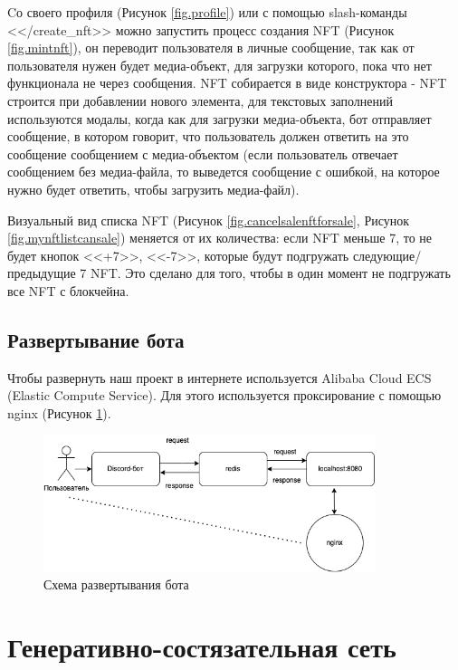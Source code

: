 Cо своего профиля (Рисунок {\color{blue} \ref{fig.profile}}) или с помощью slash-команды <</create\_nft>> можно запустить процесс создания NFT (Рисунок {\color{blue} \ref{fig.mintnft}}), он переводит пользователя в личные сообщение, так как от пользователя нужен будет медиа-объект, для загрузки которого, пока что нет функционала не через сообщения. NFT собирается в виде конструктора - NFT строится при добавлении нового элемента, для текстовых заполнений используются модалы, когда как для загрузки медиа-объекта, бот отправляет сообщение, в котором говорит, что пользователь должен ответить на это сообщение сообщением с медиа-объектом (если пользователь отвечает сообщением без медиа-файла, то выведется сообщение с ошибкой, на которое нужно будет ответить, чтобы загрузить медиа-файл).

\begin{remark}
    Визуальный вид списка NFT (Рисунок {\color{blue} \ref{fig.cancelsalenftforsale}}, Рисунок {\color{blue} \ref{fig.mynftlistcansale}}) меняется от их количества: если NFT меньше 7, то не будет кнопок <<+7>>, <<-7>>, которые будут подгружать следующие/предыдущие 7 NFT. Это сделано для того, чтобы в один момент не подгружать все NFT с блокчейна.

\end{remark}

\subsection{Развертывание бота}
	Чтобы развернуть наш проект в интернете используется Alibaba Cloud ECS (Elastic Compute Service). Для этого используется проксирование с помощью nginx (Рисунок {\color{blue} \ref{fig.nginxganservice}}).
	\begin{figure}
		\centering
		\includegraphics[height=40mm]{fig/nginxganservice.png}
		\caption{Схема развертывания бота}
        \label{fig.nginxganservice}
	\end{figure}

\section{Генеративно-состязательная сеть}
\label{section.generative_adversial_network}

